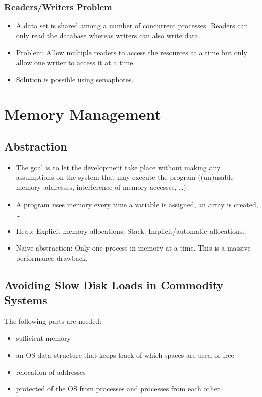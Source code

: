 \documentclass[a4paper, 11pt, accentcolor = tud3b]{tudreport}
\begin{document}

            \subsection{Readers/Writers Problem}
                \begin{itemize}
                	\item A data set is shared among a number of concurrent processes. Readers can only read the database whereas writers can also write data.
                	\item Problem: Allow multiple readers to access the resources at a time but only allow one writer to access it at a time.
                	\item Solution is possible using semaphores.
                \end{itemize}
            

    \chapter{Memory Management}
        \section{Abstraction}
            \begin{itemize}
            	\item The goal is to let the development take place without making any assumptions on the system that may execute the program ((un)usable memory addresses, interference of memory accesses, \dots).
            	\item A program uses memory every time a variable is assigned, an array is created, \dots
            	\item Heap: Explicit memory allocations. Stack: Implicit/automatic allocations.
            	\item Naive abstraction: Only one process in memory at a time. This is a massive performance drawback.
            \end{itemize}

        \section{Avoiding Slow Disk Loads in Commodity Systems}
	        The following parts are needed:
            \begin{itemize}
            	\item sufficient memory
            	\item an OS data structure that keeps track of which spaces are used or free
            	\item relocation of addresses
            	\item protected of the OS from processes and processes from each other
            \end{itemize}
\end{document}
